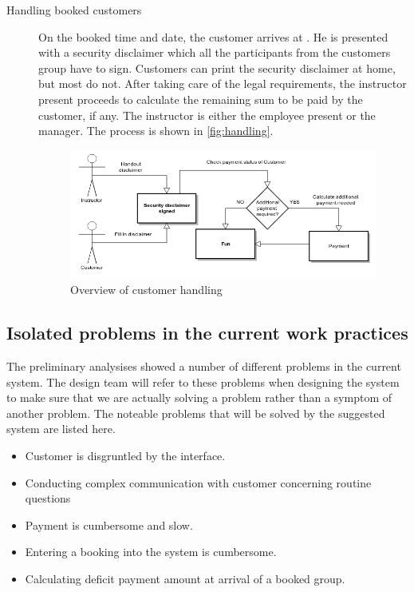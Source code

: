 \begin{description}
\item[Handling booked customers]
On the booked time and date, the customer arrives at \gomonkey{}. He is presented with a security disclaimer
which all the participants from the customers group have to sign. Customers can print the security disclaimer 
at home, but most do not. After taking care of the legal requirements, the instructor present proceeds to
calculate the remaining sum to be paid by the customer, if any. The instructor is either the employee present
or the manager. The process is shown in \autoref{fig:handling}. 

\begin{figure}[htbp]
    \centering
        \includegraphics[width=\textwidth]{figures/handling.png}
            \caption{Overview of customer handling}
        \label{fig:handling}
\end{figure}
\end{description}


\subsection{Isolated problems in the current work practices}
The preliminary analysises showed a number of different problems in the current system. 
The design team will refer to these problems when designing the system
to make sure that we are actually solving a problem rather than a symptom
of another problem. The noteable problems that will be solved by the suggested system are listed here.

\begin{itemize}
	\item Customer is disgruntled by the interface.
	\item Conducting complex communication with customer concerning routine questions
	\item Payment is cumbersome and slow.
	\item Entering a booking into the system is cumbersome.
	\item Calculating deficit payment amount at arrival of a booked group.
\end{itemize}

